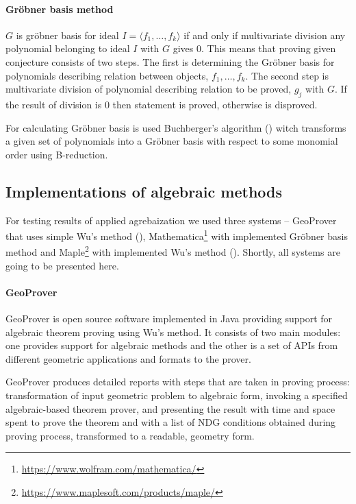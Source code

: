 \documentclass[final,1p,times,authoryear]{elsarticle}
\begin{document}
\paragraph{Gr\"obner basis method}

$G$ is gr\"obner basis for ideal $I = \langle f_1, \ldots, f_k
\rangle$ if and only if multivariate division any polynomial belonging
to ideal $I$ with $G$ gives $0$. This means that proving given
conjecture consists of two steps. The first is determining the
Gr\"obner basis for polynomials describing relation between objects,
$f_1, \ldots, f_k$. The second step is multivariate division of
polynomial describing relation to be proved, $g_j$ with $G$. If the
result of division is $0$ then statement is proved, otherwise is
disproved.

For calculating Gr\"obner basis is used Buchberger's algorithm
(\cite{buchberger}) witch transforms a given set of polynomials into a
Gr\"obner basis with respect to some monomial order using B-reduction.

\subsection{Implementations of algebraic methods}

For testing results of applied agrebaization we used three systems --
GeoProver that uses simple Wu's method (\cite{geoprover}),
Mathematica\footnote{\url{https://www.wolfram.com/mathematica/}} with
implemented Gr\"obner basis method and
Maple\footnote{\url{https://www.maplesoft.com/products/maple/}} with
implemented Wu's method (\cite{wsolve}). Shortly, all systems are
going to be presented here.

\paragraph{GeoProver}

GeoProver is open source software implemented in Java providing
support for algebraic theorem proving using Wu's method. It consists
of two main modules: one provides support for algebraic methods and
the other is a set of APIs from different geometric applications and
formats to the prover.

GeoProver produces detailed reports with steps that are taken in
proving process: transformation of input geometric problem to
algebraic form, invoking a specified algebraic-based theorem prover,
and presenting the result with time and space spent to prove the
theorem and with a list of NDG conditions obtained during proving
process, transformed to a readable, geometry form.
\end{document}
